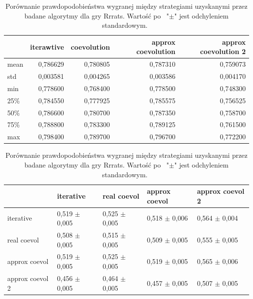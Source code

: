 \documentclass[inzynierska]{pwr_wmat_praca_dyplomowa}
\theoremstyle{plain}
\numberwithin{theorem}{chapter}
\theoremstyle{definition}
\numberwithin{theorem}{chapter}
\begin{document}
\begin{table}
	\begin{center}
		\begin{tabular}{lrrrr}
			\toprule
			{} &  iterawtive &  coevolution &  approx coevolution &  approx coevolution 2 \\
			\midrule
			mean  &    0,786629 &     0,780805 &             0,787310 &               0,759073 \\
			std   &    0,003581 &     0,004265 &             0,003586 &               0,004170 \\
			min   &    0,778600 &     0,768400 &             0,778500 &               0,748300 \\
			25\%   &    0,784550 &     0,777925 &             0,785575 &               0,756525 \\
			50\%   &    0,786600 &     0,780700 &             0,787350 &               0,758700 \\
			75\%   &    0,788800 &     0,783300 &             0,789125 &               0,761500 \\
			max   &    0,798400 &     0,789700 &             0,796700 &               0,772200 \\
			\bottomrule
		\end{tabular}
		\caption{Rezultaty uzyskanych strategii przeciwko losowej strategii początkowej dla gry Rrrats.}
		\label{table:rrrats_results}
	\end{center}
	\begin{center}
		\begin{tabular}{lllll}
			\toprule
			{} &        iterative &      real coevol &    approx coevol &  approx coevol 2 \\
			\midrule
			iterative       &  0,519 $\pm$ 0,005 &  0,525 $\pm$ 0,005 &  0,518 $\pm$ 0,006 &  0,564 $\pm$ 0,004 \\
			real coevol     &  0,508 $\pm$ 0,005 &  0,515 $\pm$ 0,005 &  0,509 $\pm$ 0,005 &  0,555 $\pm$ 0,005 \\
			approx coevol   &  0,519 $\pm$ 0,005 &  0,525 $\pm$ 0,005 &  0,519 $\pm$ 0,005 &  0,565 $\pm$ 0,006 \\
			approx coevol 2 &  0,456 $\pm$ 0,005 &  0,464 $\pm$ 0,005 &  0,457 $\pm$ 0,005 &  0,507 $\pm$ 0,005 \\
			\bottomrule
		\end{tabular}
		\caption{Porównanie prawdopodobieństwa wygranej między strategiami uzyskanymi przez badane algorytmy dla gry Rrrats. Wartość po  "$\pm$" jest odchyleniem standardowym. }
		\label{table:rrrats_results_all}
	\end{center}
\end{table}
\end{document}
